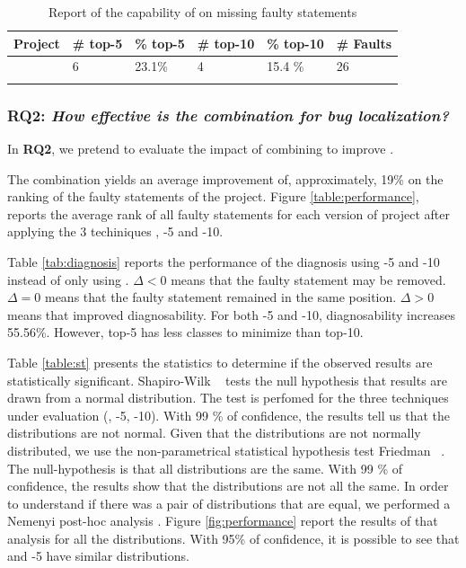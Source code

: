 \documentclass{article}
\begin{document}
\begin{table}[h]
	\centering
	\setlength{\tabcolsep}{4pt}
	\begin{tabular}{llllll}
		\toprule
		Project             &  \# top-5  & \% top-5 & \# top-10 & \% top-10 & \# Faults \\ 
		\midrule
		\chart{}  & 6 & 23.1\% & 4 & 15.4 \%  & 26\\
		\jtime{}  &  &  &  &   & \\
		\bottomrule
	\end{tabular}
	\caption { Report of the capability of \ds{} on missing faulty statements}
	\label{tab:fs}
\end{table}
\normalsize



\subsubsection{RQ2: \textit{How effective is the \comb{} combination for bug localization?}}


In \textbf{RQ2}, we pretend to evaluate the impact of combining \ds{} to improve \ds{}.

The \comb{} combination yields an average improvement of, approximately, 19\% on the ranking of the faulty statements of the \chart{}
project. Figure \ref{table:performance}, reports the average rank of all faulty statements for each version of \chart{} project after
applying the 3 techiniques \sfl{}, \comb{}-5 and \comb{}-10.

Table \ref{tab:diagnosis} reports the performance of the diagnosis using \comb{}-5 and \comb{}-10 instead of only using \sfl{}. $\Delta<0$ means that the faulty statement may be removed. $\Delta=0$ means that the faulty statement remained in the same position. $\Delta>0$ means that \ds{} improved diagnosability. For both \comb{}-5 and \comb{}-10, diagnosability increases 55.56\%. However, top-5 has less classes to minimize than top-10.

Table \ref{table:st} presents the statistics to determine if the observed results are statistically significant. Shapiro-Wilk ~\cite{10.2307/2333709} tests the null hypothesis that results are drawn from a normal distribution. The test is perfomed for the three techniques under evaluation (\sfl{}, \comb{}-5, \comb{}-10). With 99 \% of confidence, the results tell us that the distributions are not normal. Given that the distributions are not normally distributed, we use the non-parametrical statistical hypothesis test Friedman ~\cite{10.2307/2279372}. The null-hypothesis is that all distributions are the same. With 99 \% of confidence, the results show that the distributions are not all the same. In order to understand if there was a pair of distributions that are equal, we performed a Nemenyi post-hoc analysis . Figure \ref{fig:performance} report the results of that analysis for all the distributions. With 95\% of confidence, it is possible to see that \sfl{} and \comb{}-5 have similar distributions.
\end{document}
